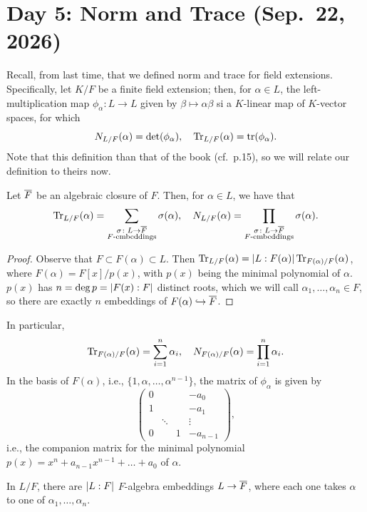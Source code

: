 \section{Day 5: Norm and Trace (Sep.\ 22, 2026)}
Recall, from last time, that we defined norm and trace for field extensions. Specifically, let $K/F$ be a finite field extension; then, for $\alpha \in L$, the left-multiplication map $\phi_\alpha \colon L \to L$ given by $\beta \mapsto \alpha\beta$ si a $K$-linear map of $K$-vector spaces, for which
\[ N_{L/F}(\alpha) = \det(\phi_\alpha), \quad \operatorname{Tr}_{L/F}(\alpha) = \operatorname{tr}(\phi_\alpha). \]
Note that this definition than that of the book (cf.\ p.15), so we will relate our definition to theirs now.
\begin{proposition} \label{prop:trace_and_norm_formulation}
    Let $\overline F$ be an algebraic closure of $F$. Then, for $\alpha \in L$, we have that
    \[ \operatorname{Tr}_{L/F}(\alpha) = \sum_{\substack{\sigma \colon L \to \overline F \\ \text{$F$-embeddings}}} \sigma(\alpha), \quad N_{L/F}(\alpha) = \prod_{\substack{\sigma \colon L \to \overline F \\ \text{$F$-embeddings}}} \sigma(\alpha). \]
\end{proposition} \vspace{-8pt}
\begin{proof}
    Observe that $F \subset F(\alpha) \subset L$. Then $\operatorname{Tr}_{L/F}(\alpha) = \left\lvert L : F(\alpha) \right\rvert \operatorname{Tr}_{F(\alpha)/F}(\alpha)$, where $F(\alpha) = F[x]/p(x)$, with $p(x)$ being the minimal polynomial of $\alpha$. $p(x)$ has $n = \deg p = \left\lvert F(x) : F \right\rvert$ distinct roots, which we will call $\alpha_1, \dots, \alpha_n \in F$, so there are exactly $n$ embeddings of $F(\alpha) \hookrightarrow \overline F$.
\end{proof}

In particular,
\[ \operatorname{Tr}_{F(\alpha)/F}(\alpha) = \sum_{i=1}^n \alpha_i, \quad N_{F(\alpha)/F}(\alpha) = \prod_{i=1}^n \alpha_i. \]
In the basis of $F(\alpha)$, i.e., $\{1, \alpha, \dots, \alpha^{n-1}\}$, the matrix of $\phi_\alpha$ is given by
\[ \begin{pmatrix}
    0 & & & -a_0 \\ 1 & & & -a_1 \\ & \ddots & & \vdots \\ 0 & & 1 & -a_{n-1}
\end{pmatrix}, \]
i.e., the companion matrix for the minimal polynomial $p(x) = x^n + a_{n-1} x^{n-1} + \dots + a_0$ of $\alpha$.

In $L/F$, there are $\left\lvert L : F \right\rvert$ $F$-algebra embeddings $L \to \overline F$, where each one takes $\alpha$ to one of $\alpha_1, \dots, \alpha_n$.

